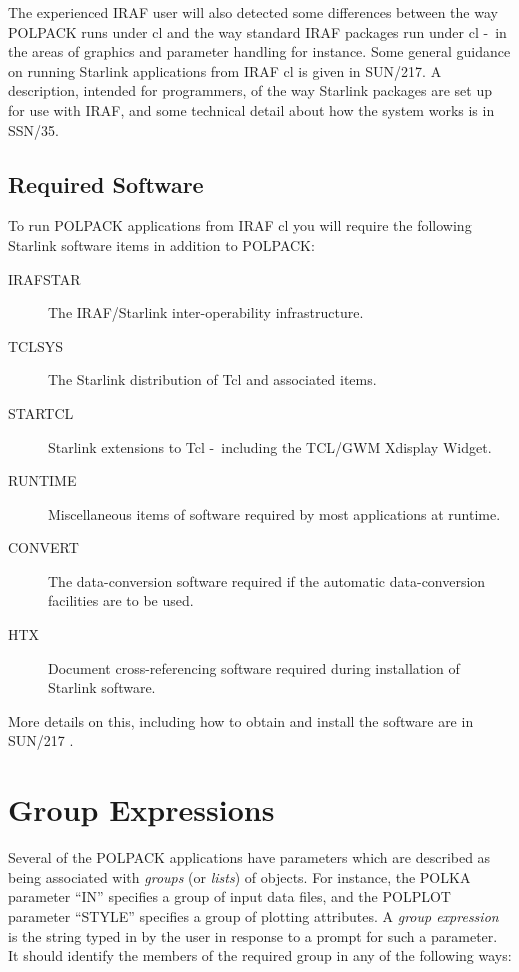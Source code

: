\documentclass[twoside,11pt]{article}
\newcommand{\htmladdnormallink}[2]{#1}
\newcommand{\htmlref}[2]{#1}
\newcommand{\xref}[3]{#1}
\newcommand{\xlabel}[1]{}
\renewcommand{\_}{\texttt{\symbol{95}}}
\newcommand{\dash}{--}
\renewcommand{\dash}{-}
\newcommand{\TCLURL}{http://www.scriptics.com/}
\begin{document}
The experienced IRAF user will also detected some differences between the
way POLPACK runs under cl and the way standard IRAF packages run under cl
\dash\ in the areas of graphics and parameter handling for instance. Some
general guidance on running Starlink applications from IRAF cl is given in 
\xref{SUN/217}{sun217}{}. A description, intended for programmers, of the 
way Starlink packages are set up for use with IRAF, and some technical 
detail about how the system works is in \xref{SSN/35}{ssn35}{}.

\subsection{Required Software}
To run POLPACK applications from IRAF cl you will require the following
Starlink software items in addition to POLPACK:

\begin{description}

\item[\xref{IRAFSTAR}{ssn35}{}] The IRAF/Starlink inter-operability 
infrastructure.

\item[\xref{TCLSYS}{sun200}{}] The Starlink distribution of 
\htmladdnormallink{Tcl}{\TCLURL} and associated items. 

\item[\xref{STARTCL}{sun186}{}] Starlink extensions to Tcl \dash\ including
the TCL/GWM Xdisplay Widget.

\item[RUNTIME] Miscellaneous items of software required by most applications
at runtime.

\item[\xref{CONVERT}{sun55}{}] The data-conversion software required if the 
automatic data-conversion facilities are to be used.

\item[\xref{HTX}{sun188}{}] Document cross-referencing software required during 
installation of Starlink software.

\end{description}

More details on this, including how to obtain and install the software are in
\xref{SUN/217}{sun217}{installing_the_starlink_software}
.

\section{\label{SEC:GRPEXP}\xlabel{groupexpressions}Group Expressions}
Several of the POLPACK applications have parameters which are described
 as being associated with
\emph{groups} (or \emph{lists}) of objects. For instance, the 
\htmlref{POLKA}{POLKA} parameter ``IN'' specifies a group of input data 
files, and the \htmlref{POLPLOT}{POLPLOT} parameter ``STYLE'' specifies a
group of plotting attributes. A \emph{group expression} is the string
typed in by the user in response to a prompt for such a parameter. It
should identify the members of the required group in any of the following
ways:
\end{document}
